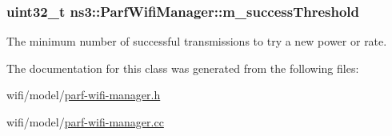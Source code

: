 \subsubsection[{\texorpdfstring{m\+\_\+success\+Threshold}{m_successThreshold}}]{\setlength{\rightskip}{0pt plus 5cm}uint32\+\_\+t ns3\+::\+Parf\+Wifi\+Manager\+::m\+\_\+success\+Threshold\hspace{0.3cm}{\ttfamily [private]}}\hypertarget{classns3_1_1ParfWifiManager_a20cddc69111e0c419ae3f4c36e4d4548}{}\label{classns3_1_1ParfWifiManager_a20cddc69111e0c419ae3f4c36e4d4548}


The minimum number of successful transmissions to try a new power or rate. 



The documentation for this class was generated from the following files\+:\begin{DoxyCompactItemize}
\item 
wifi/model/\hyperlink{parf-wifi-manager_8h}{parf-\/wifi-\/manager.\+h}\item 
wifi/model/\hyperlink{parf-wifi-manager_8cc}{parf-\/wifi-\/manager.\+cc}\end{DoxyCompactItemize}
